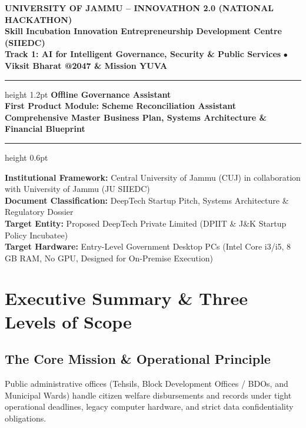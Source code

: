 \documentclass[11pt,a4paper]{article}
\newcommand{\JK}{J\&K}
\begin{document}
\begin{center}
    {\large \textbf{UNIVERSITY OF JAMMU -- INNOVATHON 2.0 (NATIONAL HACKATHON)}}\\[0.15cm]
    {\normalsize \textbf{Skill Incubation Innovation Entrepreneurship Development Centre (SIIEDC)}}\\[0.1cm]
    {\small \textbf{Track 1: AI for Intelligent Governance, Security \& Public Services} \quad $\bullet$ \quad \textbf{Viksit Bharat @2047 \& Mission YUVA}}\\[0.25cm]
    \hrule height 1.2pt
    \vspace{0.3cm}
    {\LARGE \textbf{Offline Governance Assistant}}\\[0.15cm]
    {\large \textbf{First Product Module: Scheme Reconciliation Assistant}}\\[0.15cm]
    {\normalsize \textbf{Comprehensive Master Business Plan, Systems Architecture \& Financial Blueprint}}\\[0.2cm]
    \hrule height 0.6pt
\end{center}

\vspace{0.2cm}
\noindent\textbf{Institutional Framework:} Central University of Jammu (CUJ) in collaboration with University of Jammu (JU SIIEDC)\\
\textbf{Document Classification:} DeepTech Startup Pitch, Systems Architecture \& Regulatory Dossier\\
\textbf{Target Entity:} Proposed DeepTech Private Limited (DPIIT \& \JK{} Startup Policy Incubatee)\\
\textbf{Target Hardware:} Entry-Level Government Desktop PCs (Intel Core i3/i5, 8 GB RAM, No GPU, Designed for On-Premise Execution)

\vspace{0.3cm}

\section{Executive Summary \& Three Levels of Scope}

\subsection{The Core Mission \& Operational Principle}
Public administrative offices (Tehsils, Block Development Offices / BDOs, and Municipal Wards) handle citizen welfare disbursements and records under tight operational deadlines, legacy computer hardware, and strict data confidentiality obligations.
\end{document}

